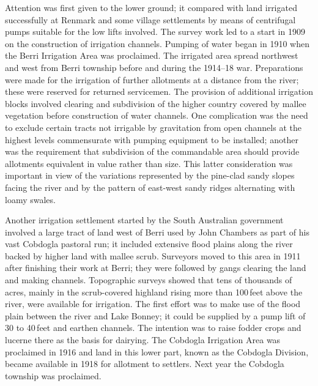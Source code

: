 Attention was first given to the lower ground; it compared with land
irrigated successfully at Renmark and some village settlements by
means of centrifugal
pumps suitable for the low lifts involved.  The survey work led to a
start in 1909 on the construction of irrigation
channels.  Pumping of water began
in 1910 when the Berri Irrigation Area was
proclaimed.  The irrigated area spread
northwest and west from Berri township before and
during the 1914--18 war. Preparations were made for the irrigation of
further allotments at a distance from the river; these were reserved
for returned servicemen.  The provision of additional irrigation
blocks involved clearing and subdivision of the higher country covered
by mallee vegetation before construction of water channels.  One
complication was the need to exclude certain tracts not irrigable by
gravitation from open channels at the highest levels commensurate with
pumping equipment to be installed;
another was the requirement that subdivision of the commandable area
should provide allotments equivalent in value rather than size.  This
latter consideration was important in view of the variations
represented by the pine-clad sandy slopes facing the river and by the
pattern of east-west sandy ridges alternating with loamy
swales.

Another irrigation settlement started by the South Australian
government involved a large tract of land west of Berri used by John
Chambers  as part of his vast Cobdogla
 pastoral run; it included extensive
flood plains along the river backed by higher land
with mallee scrub.  Surveyors moved to this area in 1911 after
finishing their work at Berri; they were followed by gangs clearing
the land and making channels.
Topographic surveys showed that tens of thousands of acres, mainly in
the scrub-covered highland rising more than 100\,feet above the river,
were available for irrigation.  The first effort was to make use of
the flood plain between the river and Lake Bonney; it could be
supplied by a pump lift of 30 to
40\,feet and earthen channels. The intention was to raise
fodder crops and lucerne there as the basis for
dairying.  The Cobdogla Irrigation Area
 was proclaimed in 1916 and land in
this lower part, known as the Cobdogla Division, became available in
1918 for allotment to settlers. Next year the Cobdogla township was
proclaimed.

